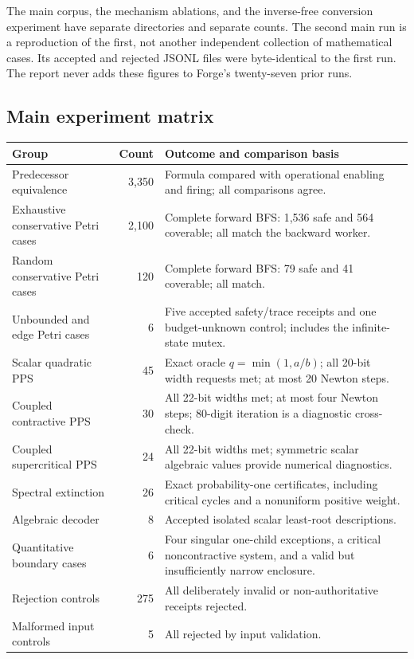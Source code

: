 \documentclass[11pt,a4paper]{article}
\theoremstyle{definition}\newtheorem{definition}[theorem]{Definition}
\theoremstyle{remark}\newtheorem{remark}[theorem]{Remark}
\begin{document}
The main corpus, the mechanism ablations, and the inverse-free conversion experiment have separate directories and separate counts. The second main run is a reproduction of the first, not another independent collection of mathematical cases. Its accepted and rejected JSONL files were byte-identical to the first run. The report never adds these figures to Forge's twenty-seven prior runs.

\subsection{Main experiment matrix}
\begin{longtable}{P{0.29\textwidth}r P{0.47\textwidth}}
\toprule
Group & Count & Outcome and comparison basis \\
\midrule
Predecessor equivalence & 3,350 & Formula compared with operational enabling and firing; all comparisons agree.\\[4pt]
Exhaustive conservative Petri cases & 2,100 & Complete forward BFS: 1,536 safe and 564 coverable; all match the backward worker.\\[4pt]
Random conservative Petri cases & 120 & Complete forward BFS: 79 safe and 41 coverable; all match.\\[4pt]
Unbounded and edge Petri cases & 6 & Five accepted safety/trace receipts and one budget-unknown control; includes the infinite-state mutex.\\[4pt]
Scalar quadratic PPS & 45 & Exact oracle $q=\min(1,a/b)$; all 20-bit width requests met; at most 20 Newton steps.\\[4pt]
Coupled contractive PPS & 30 & All 22-bit widths met; at most four Newton steps; 80-digit iteration is a diagnostic cross-check.\\[4pt]
Coupled supercritical PPS & 24 & All 22-bit widths met; symmetric scalar algebraic values provide numerical diagnostics.\\[4pt]
Spectral extinction & 26 & Exact probability-one certificates, including critical cycles and a nonuniform positive weight.\\[4pt]
Algebraic decoder & 8 & Accepted isolated scalar least-root descriptions.\\[4pt]
Quantitative boundary cases & 6 & Four singular one-child exceptions, a critical noncontractive system, and a valid but insufficiently narrow enclosure.\\[4pt]
Rejection controls & 275 & All deliberately invalid or non-authoritative receipts rejected.\\[4pt]
Malformed input controls & 5 & All rejected by input validation.\\
\bottomrule
\end{longtable}
\end{document}
